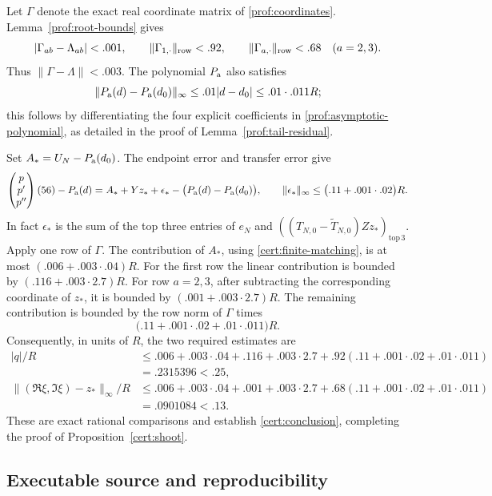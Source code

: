 Let \(\Gamma\) denote the exact real coordinate matrix of
\eqref{prof:coordinates}.
Lemma~\ref{prof:root-bounds} gives
\[
 |\Gamma_{ab}-\Lambda_{ab}|<.001,
 \qquad
 \|\Gamma_{1,\cdot}\|_{\rm row}<.92,\qquad
 \|\Gamma_{a,\cdot}\|_{\rm row}<.68\quad(a=2,3).
\]
Thus \(\|\Gamma-\Lambda\|<.003\).
The polynomial \(P_{\rm a}\) also satisfies
\begin{equation}\label{cert:pa-variation}
 \|P_{\rm a}(d)-P_{\rm a}(d_0)\|_\infty
 \le .01|d-d_0|\le .01\cdot.011R;
\end{equation}
this follows by differentiating the four explicit coefficients in
\eqref{prof:asymptotic-polynomial}, as detailed in the proof of
Lemma~\ref{prof:tail-residual}.

Set \(A_*=U_N-P_{\rm a}(d_0)\).
The endpoint error and transfer error give
\[
 \begin{pmatrix}p\\p'\\p''\end{pmatrix}(56)-P_{\rm a}(d)
 = A_*+Yz_*+\epsilon_*
       -\bigl(P_{\rm a}(d)-P_{\rm a}(d_0)\bigr),
 \qquad
 \|\epsilon_*\|_\infty\le
       \bigl(.11+.001\cdot.02\bigr)R.
\]
In fact \(\epsilon_*\) is the sum of the top three entries of \(e_N\)
and \(((T_{N,0}-\widetilde T_{N,0})Zz_*)_{\mathrm{top}\,3}\).
Apply one row of \(\Gamma\).
The contribution of \(A_*\), using \eqref{cert:finite-matching}, is at
most \((.006+.003\cdot.04)R\).
For the first row the linear contribution is bounded by
\((.116+.003\cdot2.7)R\).
For row \(a=2,3\), after subtracting the corresponding coordinate of
\(z_*\), it is bounded by \((.001+.003\cdot2.7)R\).
The remaining contribution is bounded by the row norm of \(\Gamma\)
times
\[
 \bigl(.11+.001\cdot.02+.01\cdot.011\bigr)R.
\]
Consequently, in units of \(R\), the two required estimates are
\begin{align*}
 |q|/R
 &\le .006+.003\cdot.04+.116+.003\cdot2.7
       +.92(.11+.001\cdot.02+.01\cdot.011)\\
 &=.2315396<.25,\\
 \big\|(\Re\xi,\Im\xi)-z_*\big\|_\infty/R
 &\le .006+.003\cdot.04+.001+.003\cdot2.7
       +.68(.11+.001\cdot.02+.01\cdot.011)\\
 &=.0901084<.13.
\end{align*}
These are exact rational comparisons and establish
\eqref{cert:conclusion}, completing the proof of
Proposition~\ref{cert:shoot}.

\subsection{Executable source and reproducibility}
\label{cert:provenance}

